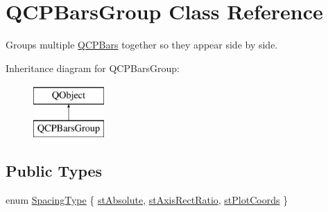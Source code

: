\hypertarget{class_q_c_p_bars_group}{}\section{Q\+C\+P\+Bars\+Group Class Reference}
\label{class_q_c_p_bars_group}


Groups multiple \hyperlink{class_q_c_p_bars}{Q\+C\+P\+Bars} together so they appear side by side.  


Inheritance diagram for Q\+C\+P\+Bars\+Group\+:\begin{figure}[H]
\begin{center}
\leavevmode
\includegraphics[height=2.000000cm]{class_q_c_p_bars_group}
\end{center}
\end{figure}
\subsection*{Public Types}
\begin{DoxyCompactItemize}
\item 
enum \hyperlink{class_q_c_p_bars_group_a4c0521120a97e60bbca37677a37075b6}{Spacing\+Type} \{ \hyperlink{class_q_c_p_bars_group_a4c0521120a97e60bbca37677a37075b6ab53fa3efaf14867dd0f14d41d64e42ac}{st\+Absolute}, 
\hyperlink{class_q_c_p_bars_group_a4c0521120a97e60bbca37677a37075b6ae94b05c27bc985dcdd8b1e1b7f163d26}{st\+Axis\+Rect\+Ratio}, 
\hyperlink{class_q_c_p_bars_group_a4c0521120a97e60bbca37677a37075b6ad369cee6287e0a86e8c2b643a3168c54}{st\+Plot\+Coords}
 \}
\end{DoxyCompactItemize}
